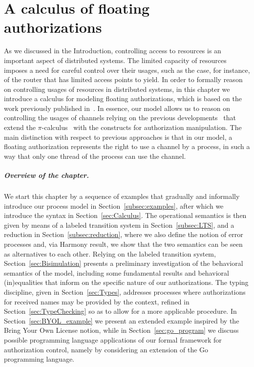 
\chapter{A calculus of floating authorizations}\label{chapter:auth}

As we discussed in the Introduction, controlling access to resources is an important aspect of distributed systems. The limited capacity of resources imposes a need for careful control over their usages, such as the case, for instance,  of the router that has limited access points to yield.
In order to formally reason on controlling usages of resources in distributed systems, in this chapter we introduce a calculus for modeling floating authorizations, which is based on the work previously published in~\cite{PROKIC2019136}. In essence, our model allows us to reason on controlling the usages of channels relying on the previous developments~\cite{DBLP:journals/corr/GhilezanJPPV16, clar:eke} that extend the $\pi$-calculus~\cite{pi_calculus} with the constructs for authorization manipulation. 
The main distinction with respect to previous approaches is that in our model, a floating authorization represents the right to use a channel by a process, in such a way that only one thread of the process can use the channel. 

\paragraph{Overview of the chapter.}
We start this chapter by a sequence of examples that gradually and informally introduce our process model in Section~\ref{subsec:examples}, after which we introduce the syntax in Section~\ref{sec:Calculus}. The  operational semantics is then given by means of a labeled transition system in Section~\ref{subsec:LTS}, and a reduction in Section~\ref{subsec:reduction}, where we also define the notion of error processes and, via Harmony result, we show that the two semantics can be seen as alternatives to each other.
Relying on the labeled transition system, Section~\ref{sec:Bisimulation} presents a preliminary investigation 
of the behavioral semantics of the model, including some fundamental results and 
behavioral (in)equalities that inform on the specific nature of our authorizations.
The typing discipline, given in Section~\ref{sec:Types}, addresses 
processes where authorizations for received names may be 
provided by the context, refined in 
Section~\ref{sec:TypeChecking} so as to allow for a more applicable procedure. 
%
In 
Section~\ref{sec:BYOL_example} we present an extended example inspired by the Bring Your Own License %
notion, while in
{Section~\ref{sec:go_program} we discuss possible programming language applications of our formal framework for authorization control, namely by considering an extension of the Go programming language.}


